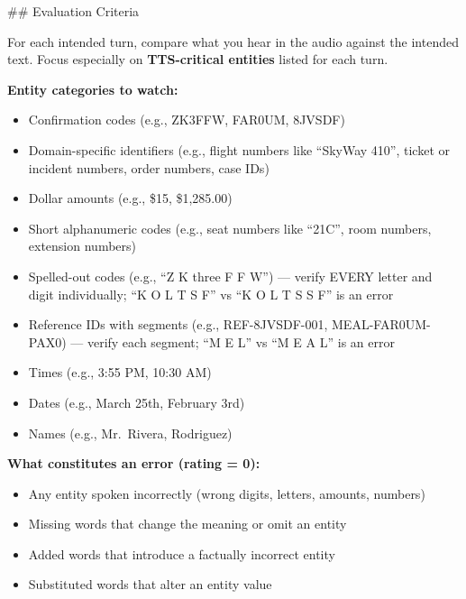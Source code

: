 \begin{tcolorbox}[promptbox, title={\small Speech Fidelity Prompt}]
        \#\# Evaluation Criteria\newline

        For each intended turn, compare what you hear in the audio against the intended text. Focus especially on \textbf{TTS-critical entities} listed for each turn.\newline

        \textbf{Entity categories to watch:}
        \begin{itemize}
          \item Confirmation codes (e.g., ZK3FFW, FAR0UM, 8JVSDF)
          \item Domain-specific identifiers (e.g., flight numbers like ``SkyWay 410'', ticket or incident numbers, order numbers, case IDs)
          \item Dollar amounts (e.g., \$15, \$1,285.00)
          \item Short alphanumeric codes (e.g., seat numbers like ``21C'', room numbers, extension numbers)
          \item Spelled-out codes (e.g., ``Z K three F F W'') --- verify EVERY letter and digit individually; ``K O L T S F'' vs ``K O L T S S F'' is an error
          \item Reference IDs with segments (e.g., REF-8JVSDF-001, MEAL-FAR0UM-PAX0) --- verify each segment; ``M E L'' vs ``M E A L'' is an error
          \item Times (e.g., 3:55 PM, 10:30 AM)
          \item Dates (e.g., March 25th, February 3rd)
          \item Names (e.g., Mr.\ Rivera, Rodriguez)
        \end{itemize}

        \textbf{What constitutes an error (rating = 0):}
        \begin{itemize}
          \item Any entity spoken incorrectly (wrong digits, letters, amounts, numbers)
          \item Missing words that change the meaning or omit an entity
          \item Added words that introduce a factually incorrect entity
          \item Substituted words that alter an entity value
        \end{itemize}


\end{tcolorbox}
